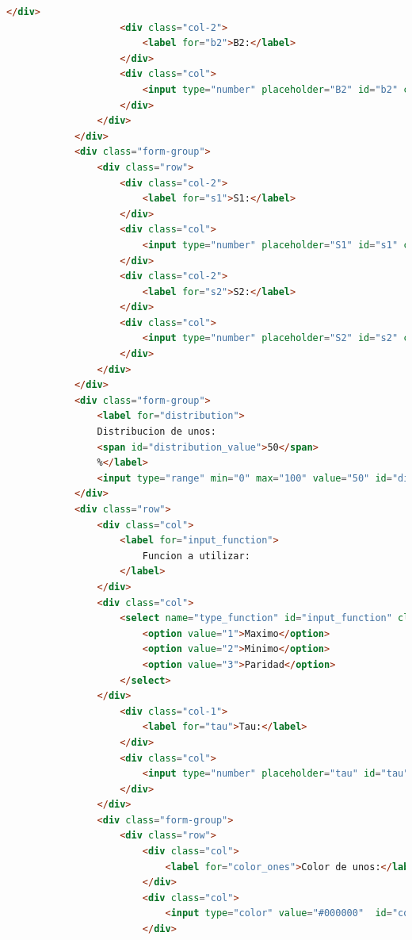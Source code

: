 \documentclass[12pt, titlepage]{article}
\begin{document}
\begin{lstlisting}[language=html]
                    </div>
                    <div class="col-2">
                        <label for="b2">B2:</label>
                    </div>
                    <div class="col">
                        <input type="number" placeholder="B2" id="b2" class="form-control" value="3"/>
                    </div>
                </div>
            </div>
            <div class="form-group">
                <div class="row">
                    <div class="col-2">
                        <label for="s1">S1:</label>
                    </div>
                    <div class="col">
                        <input type="number" placeholder="S1" id="s1" class="form-control" value="3" />
                    </div>
                    <div class="col-2">
                        <label for="s2">S2:</label>
                    </div>
                    <div class="col">
                        <input type="number" placeholder="S2" id="s2" class="form-control" value="3"/>
                    </div>
                </div>
            </div>
            <div class="form-group">
                <label for="distribution">
                Distribucion de unos:
                <span id="distribution_value">50</span>
                %</label>
                <input type="range" min="0" max="100" value="50" id="distribution">
            </div>
            <div class="row">
                <div class="col">
                    <label for="input_function">
                        Funcion a utilizar:
                    </label>
                </div>
                <div class="col">
                    <select name="type_function" id="input_function" class="form-control">
                        <option value="1">Maximo</option>
                        <option value="2">Minimo</option>
                        <option value="3">Paridad</option>
                    </select>
                </div>
                    <div class="col-1">
                        <label for="tau">Tau:</label>
                    </div>
                    <div class="col">
                        <input type="number" placeholder="tau" id="tau" class="form-control" value="3"/>
                    </div>
                </div>
                <div class="form-group">
                    <div class="row">
                        <div class="col">
                            <label for="color_ones">Color de unos:</label>
                        </div>
                        <div class="col">
                            <input type="color" value="#000000"  id="color_ones">
                        </div>

\end{lstlisting}
\end{document}
